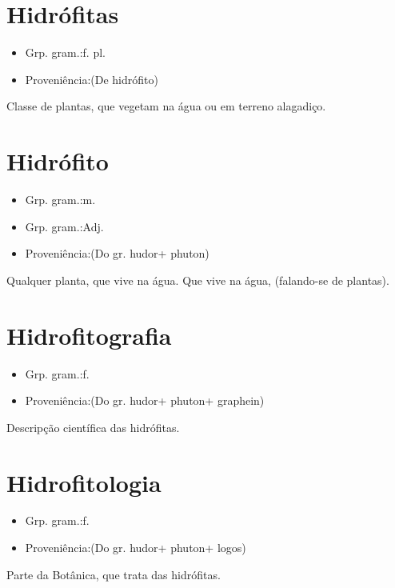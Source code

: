 \documentclass{article}
\begin{document}
\section{Hidrófitas}
\begin{itemize}
\item {Grp. gram.:f. pl.}
\end{itemize}
\begin{itemize}
\item {Proveniência:(De \textunderscore hidrófito\textunderscore )}
\end{itemize}
Classe de plantas, que vegetam na água ou em terreno alagadiço.
\section{Hidrófito}
\begin{itemize}
\item {Grp. gram.:m.}
\end{itemize}
\begin{itemize}
\item {Grp. gram.:Adj.}
\end{itemize}
\begin{itemize}
\item {Proveniência:(Do gr. \textunderscore hudor\textunderscore  + \textunderscore phuton\textunderscore )}
\end{itemize}
Qualquer planta, que vive na água.
Que vive na água, (falando-se de plantas).
\section{Hidrofitografia}
\begin{itemize}
\item {Grp. gram.:f.}
\end{itemize}
\begin{itemize}
\item {Proveniência:(Do gr. \textunderscore hudor\textunderscore  + \textunderscore phuton\textunderscore  + \textunderscore graphein\textunderscore )}
\end{itemize}
Descripção científica das hidrófitas.
\section{Hidrofitologia}
\begin{itemize}
\item {Grp. gram.:f.}
\end{itemize}
\begin{itemize}
\item {Proveniência:(Do gr. \textunderscore hudor\textunderscore  + \textunderscore phuton\textunderscore  + \textunderscore logos\textunderscore )}
\end{itemize}
Parte da Botânica, que trata das hidrófitas.
\end{document}
